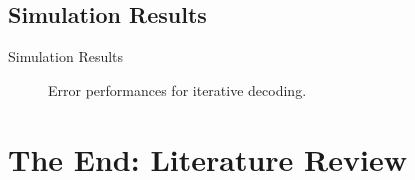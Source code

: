 \def\CTeXPreproc{Created by ctex v0.2.12, don't edit!}\documentclass{beamer}
\begin{document}
\subsection{Simulation Results}
\begin{frame}{Simulation Results}
    \begin{figure}[tbh]
    \centering
    \caption{Error performances for iterative decoding.}
    \label{fig:ber}
\end{figure}
\end{frame}
\section{The End: Literature Review}

\end{document}
